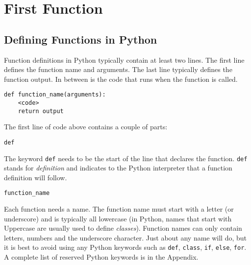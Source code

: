 \documentclass{book}
\newcommand{\passthrough}[1]{#1}
\begin{document}
    
        \hypertarget{first-function}{%
\section{First Function}\label{first-function}}
    




    
        \hypertarget{defining-functions-in-python}{%
\subsection{Defining Functions in
Python}\label{defining-functions-in-python}}
    




    
        Function definitions in Python typically contain at least two lines. The
first line defines the function name and arguments. The last line
typically defines the function output. In between is the code that runs
when the function is called.

\begin{lstlisting}
def function_name(arguments):
    <code>
    return output
\end{lstlisting}

The first line of code above contains a couple of parts:

\begin{lstlisting}
def
\end{lstlisting}

The keyword \passthrough{\lstinline!def!} needs to be the start of the
line that declares the function. \passthrough{\lstinline!def!} stands
for \emph{definition} and indicates to the Python interpreter that a
function definition will follow.

\begin{lstlisting}
function_name
\end{lstlisting}

Each function needs a name. The function name must start with a letter
(or underscore) and is typically all lowercase (in Python, names that
start with Uppercase are usually used to define \emph{classes}).
Function names can only contain letters, numbers and the underscore
character. Just about any name will do, but it is best to avoid using
any Python keywords such as \passthrough{\lstinline!def!},
\passthrough{\lstinline!class!}, \passthrough{\lstinline!if!},
\passthrough{\lstinline!else!}, \passthrough{\lstinline!for!}. A
complete list of reserved Python keywords is in the Appendix.
\end{document}
